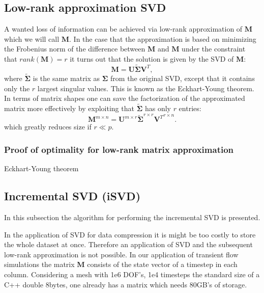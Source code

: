 \documentclass[10pt]{article}
\begin{document}
\subsection{Low-rank approximation SVD}
A wanted loss of information can be achieved via low-rank approximation of $\mathbf{M}$ which we will call $\textbf{\~M}$. In the case that the approximation is based on minimizing the Frobenius norm of the difference between $\mathbf{M}$ and $\textbf{\~M}$ under the constraint that $rank(\textbf{\~M})=r$ it turns out that the solution is given by the SVD of $\mathbf{M}$:
\begin{equation}
	\textbf{\~M}=\mathbf{U} \mathbf{\tilde\Sigma} \mathbf{V}^T,
\end{equation}
where $\mathbf{\tilde\Sigma}$ is the same matrix as $\mathbf{\Sigma}$ from the original SVD, except that it contains only the $r$ largest singular values. This is known as the Eckhart-Young theorem. In terms of matrix shapes one can save the factorization of the approximated matrix more effectively by exploiting that $\mathbf{\tilde\Sigma}$ has only $r$ entries:
\begin{equation}
\textbf{\~M}^{m\!\times\! n}=\mathbf{U}^{m\!\times\! r} \mathbf{\tilde\Sigma}^{r\!\times\! r} {\mathbf{V}^T}^{r\!\times\! n}.
\end{equation}
which greatly reduces size if $r\ll p$.
\subsubsection{Proof of optimality for low-rank matrix approximation}
Eckhart-Young theorem
\subsection{Incremental SVD (iSVD)}
In this subsection the algorithm for performing the incremental SVD \cite{Balzano2013} is presented. 

In the application of SVD for data compression it is might be too costly to store the whole dataset at once. Therefore an application of SVD and the subsequent low-rank approximation is not possible. In our application of transient flow simulations the matrix \textbf{M} consists of the state vector of a timestep in each column. Considering a mesh with 1e6 DOF's, 1e4 timesteps the standard size of a C++ double 8bytes, one already has a matrix which needs 80GB's of storage.
\end{document}
